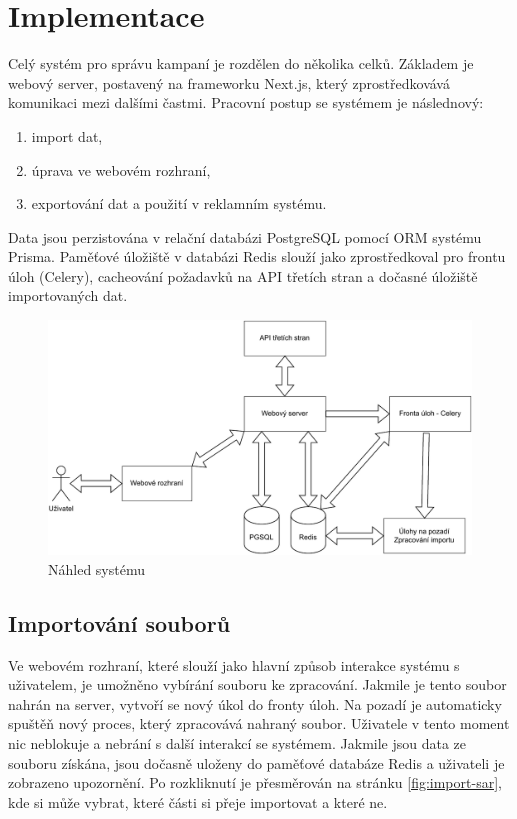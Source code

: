 \chapter{Implementace}
\label{chap:implementation}
Celý systém pro správu kampaní je rozdělen do několika celků. Základem je webový server, postavený na frameworku Next.js, který zprostředkovává komunikaci mezi dalšími častmi.
Pracovní postup se systémem je následnový:
\begin{enumerate}
    \item import dat,
    \item úprava ve webovém rozhraní,
    \item exportování dat a použití v reklamním systému.
\end{enumerate}
Data jsou perzistována v relační databázi PostgreSQL pomocí ORM systému Prisma.
Paměťové úložiště v databázi Redis slouží jako zprostředkoval pro frontu úloh (Celery), cacheování požadavků na API třetích stran a dočasné úložiště importovaných dat.

\begin{figure}[h]
    \centering
    \includegraphics[width=1\textwidth]{Figures/system-overview.pdf}
    \caption{Náhled systému}
    \label{fig:system-overview}
\end{figure}

\section{Importování souborů}
Ve webovém rozhraní, které slouží jako hlavní způsob interakce systému s uživatelem, je umožněno vybírání souboru ke zpracování.
Jakmile je tento soubor nahrán na server, vytvoří se nový úkol do fronty úloh. Na pozadí je automaticky spuštěň nový proces, který
zpracovává nahraný soubor. Uživatele v tento moment nic neblokuje a nebrání s další interakcí se systémem. Jakmile jsou data ze souboru
získána, jsou dočasně uloženy do paměťové databáze Redis a uživateli je zobrazeno upozornění.
Po rozkliknutí je přesměrován na stránku \ref{fig:import-sar}, kde si může vybrat, které části si přeje importovat a které ne.

